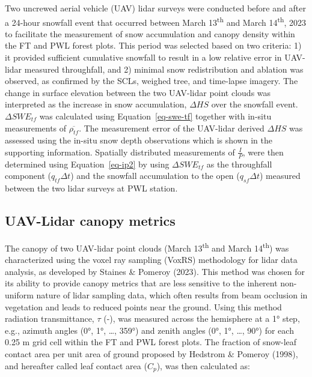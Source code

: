 \documentclass[
  letterpaper,
  DIV=11,
  numbers=noendperiod]{scrartcl}
\begin{document}
Two uncrewed aerial vehicle (UAV) lidar surveys were conducted before
and after a 24-hour snowfall event that occurred between March
13\textsuperscript{th} and March 14\textsuperscript{th}, 2023 to
facilitate the measurement of snow accumulation and canopy density
within the FT and PWL forest plots. This period was selected based on
two criteria: 1) it provided sufficient cumulative snowfall to result in
a low relative error in UAV-lidar measured throughfall, and 2) minimal
snow redistribution and ablation was observed, as confirmed by the SCLs,
weighed tree, and time-lapse imagery. The change in surface elevation
between the two UAV-lidar point clouds was interpreted as the increase
in snow accumulation, \(\Delta HS\) over the snowfall event.
\(\Delta SWE_{tf}\) was calculated using Equation~\ref{eq-swe-tf}
together with in-situ measurements of \(\overline{\rho_{tf}}\). The
measurement error of the UAV-lidar derived \(\Delta HS\) was assessed
using the in-situ snow depth observations which is shown in the
supporting information. Spatially distributed measurements of
\(\frac{I}{P}\), were then determined using Equation~\ref{eq-ip2} by
using \(\Delta SWE_{tf}\) as the throughfall component
(\(q_{tf} \Delta t\)) and the snowfall accumulation to the open
(\(q_{sf} \Delta t\)) measured between the two lidar surveys at PWL
station.

\subsection{UAV-Lidar canopy metrics}\label{uav-lidar-canopy-metrics}

The canopy of two UAV-lidar point clouds (March 13\textsuperscript{th}
and March 14\textsuperscript{th}) was characterized using the voxel ray
sampling (VoxRS) methodology for lidar data analysis, as developed by
Staines \& Pomeroy (2023). This method was chosen for its ability to
provide canopy metrics that are less sensitive to the inherent
non-uniform nature of lidar sampling data, which often results from beam
occlusion in vegetation and leads to reduced points near the ground.
Using this method radiation transmittance, \(\tau\) (-), was measured
across the hemisphere at a 1° step, e.g., azimuth angles (0°, 1°,
\ldots, 359°) and zenith angles (0°, 1°, \ldots, 90°) for each 0.25 m
grid cell within the FT and PWL forest plots. The fraction of snow-leaf
contact area per unit area of ground proposed by Hedstrom \& Pomeroy
(1998), and hereafter called leaf contact area (\(C_p\)), was then
calculated as:
\end{document}
